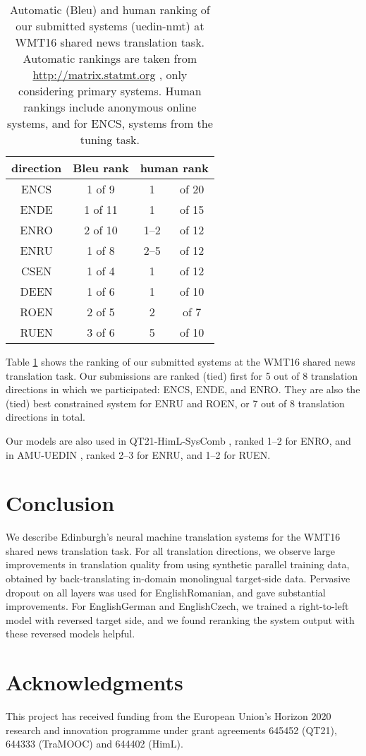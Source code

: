 \documentclass[11pt]{article}
\begin{document}
\begin{table}
\centering
\begin{tabular}{c|c|cc}
direction & {\sc Bleu} rank & \multicolumn{2}{c}{human rank}\\
\hline
ENCS & 1 of \phantom{0}9 & 1 &of 20\\
ENDE & 1 of 11 & 1 &of 15\\
ENRO & 2 of 10 & 1--2 &of 12 \\
ENRU & 1 of \phantom{0}8 & 2--5 &of 12\\
\hline
CSEN & 1 of \phantom{0}4 & 1 &of 12\\
DEEN & 1 of \phantom{0}6 & 1 &of 10\\
ROEN & 2 of \phantom{0}5 & 2 &of \phantom{0}7\\
RUEN & 3 of \phantom{0}6 & 5 &of 10\\
\end{tabular}
\caption{Automatic ({\sc Bleu}) and human ranking of our submitted systems (uedin-nmt) at WMT16 shared news translation task. Automatic rankings are taken from \url{http://matrix.statmt.org} , only considering primary systems. Human rankings include anonymous online systems, and for ENCS, systems from the tuning task.}
\label{ranking}
\end{table}

Table \ref{ranking} shows the ranking of our submitted systems at the WMT16 shared news translation task.
Our submissions are ranked (tied) first for 5 out of 8 translation directions in which we participated: ENCS, ENDE, and ENRO.
They are also the (tied) best constrained system for ENRU and ROEN, or 7 out of 8 translation directions in total.

Our models are also used in QT21-HimL-SysComb \cite{qt21syscomb2016}, ranked 1--2 for ENRO, and in AMU-UEDIN \cite{junczys2016}, ranked 2--3 for ENRU, and 1--2 for RUEN.

\section{Conclusion}

We describe Edinburgh's neural machine translation systems for the WMT16 shared news translation task.
For all translation directions, we observe large improvements in translation quality from using synthetic parallel training data, obtained by back-translating in-domain monolingual target-side data.
Pervasive dropout on all layers was used for EnglishRomanian, and gave substantial improvements.
For EnglishGerman and EnglishCzech, we trained a right-to-left model with reversed target side, and we found reranking the system output with these reversed models helpful.

\section*{Acknowledgments}

This project has received funding from the European Union's Horizon 2020 research and innovation
programme under grant agreements 645452 (QT21), 644333 (TraMOOC) and 644402 (HimL).



\end{document}
